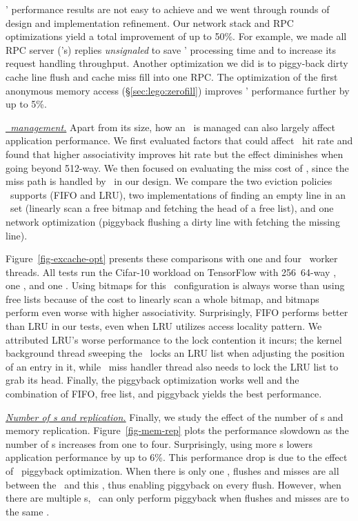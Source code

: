 \lego' performance results are not easy to achieve and we went through rounds of design and implementation refinement.
Our network stack and RPC optimizations yield a total improvement of up to 50\%.
For example, we made all RPC server (\mcomponent's) replies {\em unsignaled} to save \mcomponent' processing time
and to increase its request handling throughput.
Another optimization we did is to piggy-back dirty cache line flush and cache miss fill into one RPC.
The optimization of the first anonymous memory access (\S\ref{sec:lego:zerofill}) improves \lego' performance further by up to 5\%.

\textit{\uline{\excache\ management.}}
Apart from its size, how an \excache\ is managed can also largely affect application performance.
We first evaluated factors that could affect \excache\ hit rate and found that higher associativity improves hit rate
but the effect diminishes when going beyond 512-way.
We then focused on evaluating the miss cost of \excache, since the miss path is handled by \lego\ in our design.
We compare the two eviction policies \lego\ supports (FIFO and LRU),
two implementations of finding an empty line in an \excache\ set (linearly scan a free bitmap and fetching the head of a free list),
and one network optimization (piggyback flushing a dirty line with fetching the missing line).

Figure~\ref{fig-excache-opt} presents these comparisons with one and four \mcomponent\ worker threads. 
All tests run the Cifar-10 workload on TensorFlow with 256\MB\ 64-way \excache, one \mcomponent, and one \scomponent.
Using bitmaps for this \excache\ configuration is always worse than using free lists
because of the cost to linearly scan a whole bitmap,
and bitmaps perform even worse with higher associativity.
Surprisingly, FIFO performs better than LRU in our tests, even when LRU utilizes access locality pattern.
We attributed LRU's worse performance to the lock contention it incurs;
the kernel background thread sweeping the \excache\ locks an LRU list when adjusting the position of an entry in it,
while \excache\ miss handler thread also needs to lock the LRU list to grab its head.
Finally, the piggyback optimization works well and the combination of FIFO, free list, and piggyback yields the best performance.

\textit{\uline{Number of \mcomponent{}s and replication.}}
Finally, we study the effect of the number of \mcomponent s and memory replication.
Figure~\ref{fig-mem-rep} plots the performance slowdown as the number of \mcomponent s increases from one to four.
Surprisingly, using more \mcomponent{}s lowers application performance by up to 6\%.
This performance drop is due to the effect of \excache\ piggyback optimization. 
When there is only one \mcomponent, flushes and misses are all between the \pcomponent\ and this \mcomponent,
thus enabling piggyback on every flush.
However, when there are multiple \mcomponent{}s, \lego\ can only perform piggyback when flushes and misses are to the same \mcomponent.

